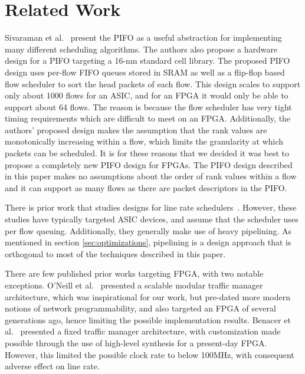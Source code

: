 \section{Related Work}

Sivaraman et al.~\cite{pifo2016} present the PIFO as a useful abstraction for implementing many different scheduling algorithms. The authors also propose a hardware design for a PIFO targeting a 16-nm standard cell library. The proposed PIFO design uses per-flow FIFO queues stored in SRAM as well as a flip-flop based flow scheduler to sort the head packets of each flow. This design scales to support only about 1000 flows for an ASIC, and for an FPGA it would only be able to support about 64 flows. The reason is because the flow scheduler has very tight timing requirements which are difficult to meet on an FPGA. Additionally, the authors' proposed design makes the assumption that the rank values are monotonically increasing within a flow, which limits the granularity at which packets can be scheduled. It is for these reasons that we decided it was best to propose a completely new PIFO design for FPGAs. The PIFO design described in this paper makes no assumptions about the order of rank values within a flow and it can support as many flows as there are packet descriptors in the PIFO.

There is prior work that studies designs for line rate schedulers~\cite{pipelined-heap-2007,pheap-2000}. However, these studies have typically targeted ASIC devices, and assume that the scheduler uses per flow queuing. Additionally, they generally make use of heavy pipelining. As mentioned in section \ref{sec:optimizations}, pipelining is a design approach that is orthogonal to most of the techniques described in this paper.

There are few published prior works targeting FPGA, with two notable exceptions.  O'Neill et al.~\cite{belfast2011} presented a scalable modular traffic manager architecture, which was inspirational for our work, but pre-dated more modern notions of network programmability, and also targeted an FPGA of several generations ago, hence limiting the possible implementation results.  Benacer et al.~\cite{montreal2017} presented a fixed traffic manager architecture, with customization made possible through the use of high-level synthesis for a present-day FPGA.  However, this limited the possible clock rate to below 100MHz, with consequent adverse effect on line rate. 


 



